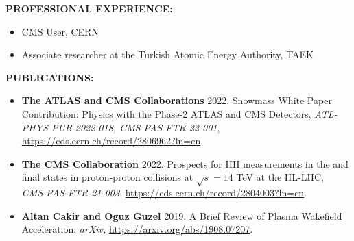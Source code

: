 \textbf{PROFESSIONAL EXPERIENCE:}   
\vspace{-3mm}
\begin{itemize}[leftmargin=0.7cm,itemsep=-0.25em,labelsep=5mm] %
	\item CMS User, CERN
	\item Associate researcher at the Turkish Atomic Energy Authority, TAEK
\end{itemize}

\textbf{PUBLICATIONS:} 
\vspace{-3mm}
\begin{itemize}[leftmargin=0.7cm,itemsep=0.5em,labelsep=5mm] %
	
	\item \textbf{The ATLAS and CMS Collaborations} 2022. Snowmass White Paper Contribution: Physics with the Phase-2 ATLAS and CMS Detectors, 
	\textit{ATL-PHYS-PUB-2022-018, CMS-PAS-FTR-22-001},
	\href{https://cds.cern.ch/record/2806962?ln=en}{https://cds.cern.ch/record/2806962?ln=en}.
	
	\item \textbf{The CMS Collaboration} 2022. Prospects for HH measurements in the \wwgg and \ttgg final states in proton-proton collisions at $\sqrt{s}=14$ TeV at the HL-LHC, 
	\textit{CMS-PAS-FTR-21-003},
	\href{https://cds.cern.ch/record/2804003?ln=en}{https://cds.cern.ch/record/2804003?ln=en}.

	\item \textbf{Altan Cakir and Oguz Guzel} 2019. A Brief Review of Plasma Wakefield Acceleration, 
	\textit{arXiv,}
	\href{https://arxiv.org/abs/1908.07207}{https://arxiv.org/abs/1908.07207}.

\end{itemize}



\newpage %
\thispagestyle{empty} %
\def\sirtyili{2022} %
\def\studentname{A. O. GÜZEL} %
\def\thesisthickness{25mm} %

